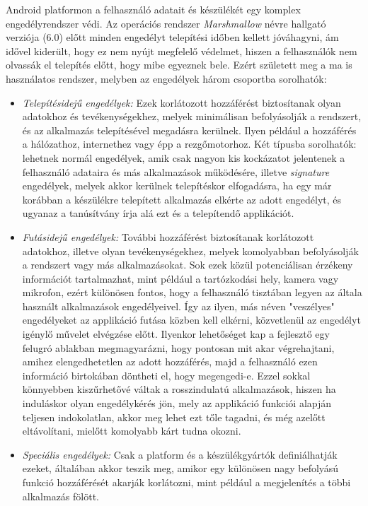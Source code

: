 Android platformon a felhasználó adatait és készülékét egy komplex engedélyrendszer védi. Az operációs rendszer \emph{Marshmallow} névre hallgató verziója (6.0) előtt minden engedélyt telepítési időben kellett jóváhagyni, ám idővel kiderült, hogy ez nem nyújt megfelelő védelmet, hiszen a felhasználók nem olvassák el telepítés előtt, hogy mibe egyeznek bele. Ezért született meg a ma is használatos rendszer, melyben az engedélyek három csoportba sorolhatók:
\begin{itemize}
	\item \emph{Telepítésidejű engedélyek:} Ezek korlátozott hozzáférést biztosítanak olyan adatokhoz és tevékenységekhez, melyek minimálisan befolyásolják a rendszert, és az alkalmazás telepítésével megadásra kerülnek. Ilyen például a hozzáférés a hálózathoz, internethez vagy épp a rezgőmotorhoz. Két típusba sorolhatók: lehetnek normál engedélyek, amik csak nagyon kis kockázatot jelentenek a felhasználó adataira és más alkalmazások működésére, illetve \emph{signature} engedélyek, melyek akkor kerülnek telepítéskor elfogadásra, ha egy már korábban a készülékre telepített alkalmazás elkérte az adott engedélyt, és ugyanaz a tanúsítvány írja alá ezt és a telepítendő applikációt. 
	\item \emph{Futásidejű engedélyek:} További hozzáférést biztosítanak korlátozott adatokhoz, illetve olyan tevékenységekhez, melyek komolyabban befolyásolják a rendszert vagy más alkalmazásokat. Sok ezek közül potenciálisan érzékeny információt tartalmazhat, mint például a tartózkodási hely, kamera vagy mikrofon, ezért különösen fontos, hogy a felhasználó tisztában legyen az általa használt alkalmazások engedélyeivel. Így az ilyen, más néven "veszélyes" engedélyeket az applikáció futása közben kell elkérni, közvetlenül az engedélyt igénylő művelet elvégzése előtt. Ilyenkor lehetőséget kap a fejlesztő egy felugró ablakban megmagyarázni, hogy pontosan mit akar végrehajtani, amihez elengedhetetlen az adott hozzáférés, majd a felhasználó ezen információ birtokában döntheti el, hogy megengedi-e. Ezzel sokkal könnyebben kiszűrhetővé váltak a rosszindulatú alkalmazások, hiszen ha induláskor olyan engedélykérés jön, mely az applikáció funkciói alapján teljesen indokolatlan, akkor meg lehet ezt tőle tagadni, és még azelőtt eltávolítani, mielőtt komolyabb kárt tudna okozni.
	\item \emph{Speciális engedélyek:} Csak a platform és a készülékgyártók definiálhatják ezeket, általában akkor teszik meg, amikor egy különösen nagy befolyású funkció hozzáférését akarják korlátozni, mint például a megjelenítés a többi alkalmazás fölött. \cite{Permissions}
\end{itemize}

